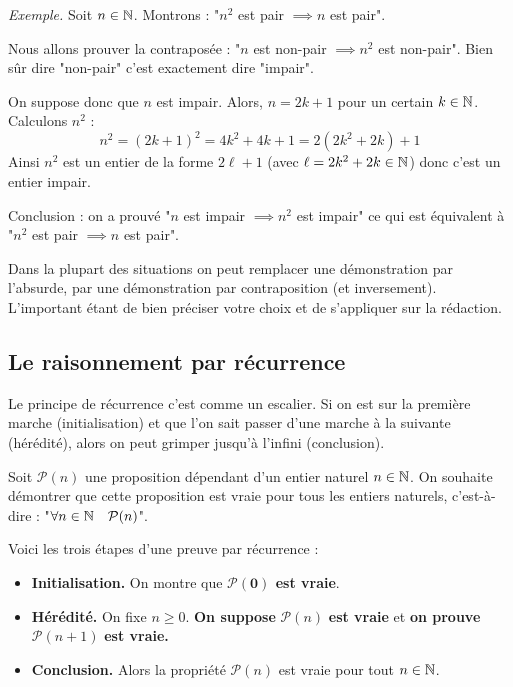 \documentclass[11pt,class=report,crop=false]{standalone}
\begin{document}
\bigskip

\emph{Exemple.}
Soit $n \in \mathbb{N}$. Montrons : "$n^2$ est pair $\implies n$ est pair".

Nous allons prouver la contraposée : "$n$ est non-pair $\implies n^2$ est non-pair".
Bien sûr dire "non-pair" c'est exactement dire "impair".

On suppose donc que $n$ est impair. Alors, $n=2k+1$ pour un certain $k\in\mathbb{N}$.
Calculons $n^2$ :
$$n^2 = (2k+1)^2 = 4k^2+4k+1 = 2(2k^2+2k) + 1$$
Ainsi $n^2$ est un entier de la forme $2\ell+1$ (avec $\ell = 2k^2+2k\in\mathbb{N}$) donc c'est un entier impair.

Conclusion : on a prouvé "$n$ est impair $\implies n^2$ est impair" ce qui est équivalent à 
 "$n^2$ est pair $\implies n$ est pair".
 

\bigskip

Dans la plupart des situations on peut remplacer une démonstration par l'absurde, par une démonstration par contraposition (et inversement). L'important étant de bien préciser votre choix et de s'appliquer sur la rédaction.
 


\subsection*{Le raisonnement par récurrence}


Le principe de récurrence c'est comme un escalier. Si on est sur la première marche (initialisation) et que l'on sait passer d'une marche à la suivante (hérédité), alors on peut grimper jusqu'à l'infini (conclusion).


Soit $\mathcal{P}(n)$ une proposition dépendant d'un entier naturel $n \in \mathbb{N}$. On souhaite démontrer que cette proposition est vraie pour tous les entiers naturels, c'est-à-dire : "$\forall n \in \mathbb{N} \quad \mathcal{P}(n)$".

Voici les trois étapes d'une preuve par récurrence :
\begin{itemize}
    \item \textbf{Initialisation.}
    On montre que \textbf{$\boldsymbol{\mathcal{P}(0)}$ est vraie}. 
    
    \item \textbf{Hérédité.}    
    On fixe $n\ge0$. \textbf{On suppose} \boldmath $\mathcal{P}(n)$ \textbf{est vraie} et \textbf{on prouve} $\mathcal{P}(n+1)$ \unboldmath \textbf{est vraie.}
    
    \item \textbf{Conclusion.} 
    Alors la propriété $\mathcal{P}(n)$ est vraie pour tout $n \in \mathbb{N}$.
\end{itemize}    
 
\end{document}
